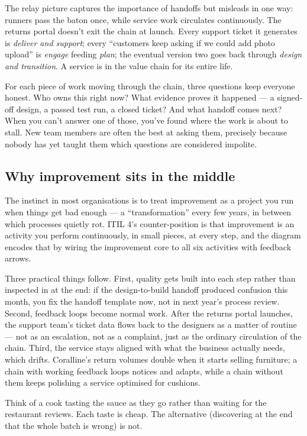 The relay picture captures the importance of handoffs but misleads in one way: runners pass the baton once, while service work circulates continuously. The returns portal doesn't exit the chain at launch. Every support ticket it generates is \emph{deliver and support}; every ``customers keep asking if we could add photo upload'' is \emph{engage} feeding \emph{plan}; the eventual version two goes back through \emph{design and transition}. A service is in the value chain for its entire life.


For each piece of work moving through the chain, three questions keep everyone honest. Who owns this right now? What evidence proves it happened — a signed-off design, a passed test run, a closed ticket? And what handoff comes next? When you can't answer one of those, you've found where the work is about to stall. New team members are often the best at asking them, precisely because nobody has yet taught them which questions are considered impolite.



\subsection{Why improvement sits in the middle}


The instinct in most organisations is to treat improvement as a project you run when things get bad enough — a ``transformation'' every few years, in between which processes quietly rot. ITIL 4's counter-position is that improvement is an activity you perform continuously, in small pieces, at every step, and the diagram encodes that by wiring the improvement core to all six activities with feedback arrows.


Three practical things follow. First, quality gets built into each step rather than inspected in at the end: if the design-to-build handoff produced confusion this month, you fix the handoff template now, not in next year's process review. Second, feedback loops become normal work. After the returns portal launches, the support team's ticket data flows back to the designers as a matter of routine — not as an escalation, not as a complaint, just as the ordinary circulation of the chain. Third, the service stays aligned with what the business actually needs, which drifts. Coralline's return volumes double when it starts selling furniture; a chain with working feedback loops notices and adapts, while a chain without them keeps polishing a service optimised for cushions.


Think of a cook tasting the sauce as they go rather than waiting for the restaurant reviews. Each taste is cheap. The alternative (discovering at the end that the whole batch is wrong) is not.



